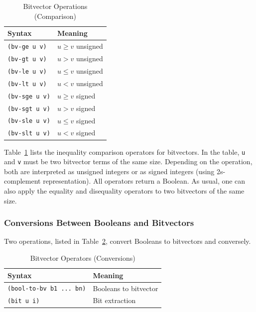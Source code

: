 \documentclass[11pt,twoside,fleqn,openright,titlepage]{cslreport}
\begin{document}
\begin{table}
\begin{small}
\begin{center}
\begin{tabular}{|p{3cm}|l|}
\hline
Syntax & Meaning \\
\hline
\texttt{(bv-ge u v)} & $u \geq v$ unsigned\\
\texttt{(bv-gt u v)} & $u > v$ unsigned \\
\texttt{(bv-le u v)} & $u \leq v$ unsigned \\
\texttt{(bv-lt u v)} & $u < v$ unsigned \\
\hline
\texttt{(bv-sge u v)} & $u \geq v$ signed\\
\texttt{(bv-sgt u v)} & $u > v$ signed \\
\texttt{(bv-sle u v)} & $u \leq v$ signed \\
\texttt{(bv-slt u v)} & $u < v$ signed \\
\hline
\end{tabular}
\end{center}
\end{small}
\caption{Bitvector Operations (Comparison)}
\label{bitvectors5}
\end{table}

Table~\ref{bitvectors5} lists the inequality comparison operators for
bitvectors. In the table, \texttt{u} and \texttt{v} must be two
bitvector terms of the same size. Depending on the operation, both are
interpreted as unsigned integers or as signed integers (using
2s-complement representation).  All operators return a Boolean. As
usual, one can also apply the equality and disequality operators to
two bitvectors of the same size.


\subsubsection*{Conversions Between Booleans and Bitvectors}

Two operations, listed in Table~\ref{bitvectors6},  convert Booleans 
to bitvectors and conversely.

\begin{table}[h]
\begin{small}
\begin{center}
\begin{tabular}{|p{5cm}|l|}
\hline
Syntax & Meaning \\
\hline
\texttt{(bool-to-bv b1 ... bn)} & Booleans to bitvector \\
\texttt{(bit u i)} & Bit extraction\\
\hline
\end{tabular}
\end{center}
\end{small}
\caption{Bitvector Operators (Conversions)}
\label{bitvectors6}
\end{table}
\end{document}
